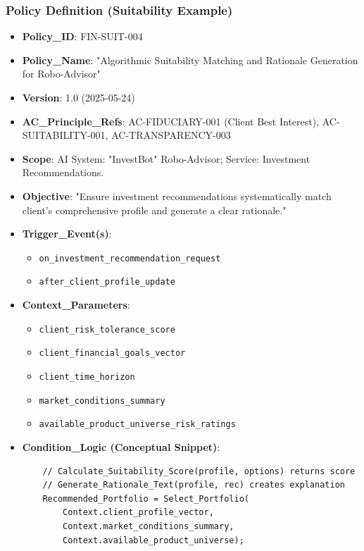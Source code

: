 \documentclass[sigconf,review,anonymous=false]{acmart} %
\begin{document}
\subsubsection{Policy Definition (Suitability Example)}
\begin{itemize}
    \item \textbf{Policy\_ID}: FIN-SUIT-004
    \item \textbf{Policy\_Name}: "Algorithmic Suitability Matching and Rationale Generation for Robo-Advisor"
    \item \textbf{Version}: 1.0 (2025-05-24)
    \item \textbf{AC\_Principle\_Refs}: AC-FIDUCIARY-001 (Client Best Interest), AC-SUITABILITY-001, AC-TRANSPARENCY-003
    \item \textbf{Scope}: AI System: "InvestBot" Robo-Advisor; Service: Investment Recommendations.
    \item \textbf{Objective}: "Ensure investment recommendations systematically match client's comprehensive profile and generate a clear rationale."
    \item \textbf{Trigger\_Event(s)}:
    \begin{itemize}
        \item \texttt{on\_investment\_recommendation\_request}
        \item \texttt{after\_client\_profile\_update}
    \end{itemize}
    \item \textbf{Context\_Parameters}:
    \begin{itemize}
        \item \texttt{client\_risk\_tolerance\_score}
        \item \texttt{client\_financial\_goals\_vector}
        \item \texttt{client\_time\_horizon}
        \item \texttt{market\_conditions\_summary}
        \item \texttt{available\_product\_universe\_risk\_ratings}
    \end{itemize}
    \item \textbf{Condition\_Logic (Conceptual Snippet)}:
    {\scriptsize
    \begin{verbatim}
    // Calculate_Suitability_Score(profile, options) returns score
    // Generate_Rationale_Text(profile, rec) creates explanation
    Recommended_Portfolio = Select_Portfolio(
        Context.client_profile_vector,
        Context.market_conditions_summary,
        Context.available_product_universe);

\end{verbatim}}
\end{itemize}
\end{document}
